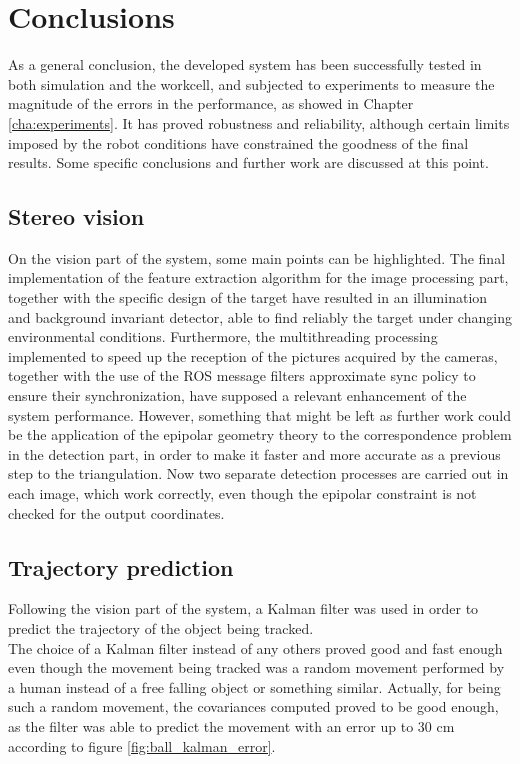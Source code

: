 
\chapter{Conclusions} %
\label{cha:conclusions}
As a general conclusion, the developed system has been successfully tested in both simulation and the workcell, and subjected to experiments to measure the magnitude of the errors in the performance, as showed in Chapter \ref{cha:experiments}.
It has proved robustness and reliability, although certain limits imposed by the robot conditions have constrained the goodness of the final results. Some specific conclusions and further work are discussed at this point.

\section{Stereo vision}
On the vision part of the system, some main points can be highlighted.
The final implementation of the feature extraction algorithm for the image processing part, together with the specific design of the target have resulted in an illumination and background invariant detector, able to find reliably the target under changing environmental conditions.
Furthermore, the multithreading processing implemented to speed up the reception of the pictures acquired by the cameras, together with the use of the ROS message filters approximate sync policy to ensure their synchronization, have supposed a relevant enhancement of the system performance.
However, something that might be left as further work could be the application of the epipolar geometry theory to the correspondence problem in the detection part, in order to make it faster and more accurate as a previous step to the triangulation. 
Now two separate detection processes are carried out in each image, which work correctly, even though the epipolar constraint is not checked for the output coordinates.

\section{Trajectory prediction}
Following the vision part of the system, a Kalman filter was used in order to predict the trajectory of the object being tracked.\\

The choice of a Kalman filter instead of any others proved good and fast enough even though the movement being tracked was a random movement performed by a human instead of a free falling object or something similar. Actually, for being such a random movement, the covariances computed proved to be good enough, as the filter was able to predict the movement with an error up to 30 cm according to figure \ref{fig:ball_kalman_error}.

